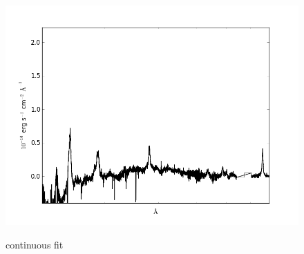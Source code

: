 \documentclass[usenatbib]{mn2e}
\begin{document}
\begin{figure}
\begin{center}
\hspace{5mm}
\includegraphics[width=0.49\linewidth,angle=0]{no_continuous_13.png}\\

\end{center} 
\caption{continuous fit \label{fig:landscape}}   
\end{figure}

\newpage
\end{document}
